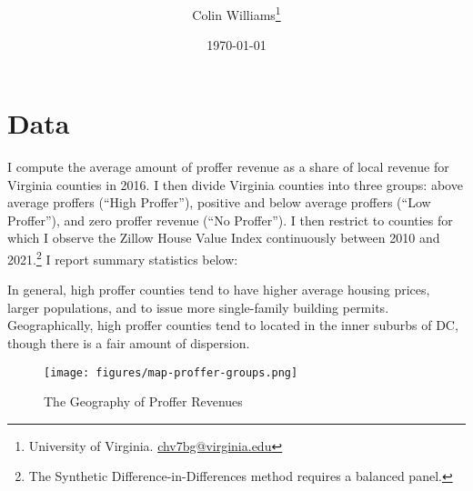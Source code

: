 \documentclass[12pt]{article}
\title{ \vspace*{-2.5cm} \hspace*{-0.5cm} }
\author{Colin Williams\thanks{University of Virginia.
\href{mailto:chv7bg@virginia.edu}{chv7bg@virginia.edu}}}
\date{ \vspace*{0.5cm} \today} %
\begin{document}
\bgroup
\let\footnoterule\relax

\maketitle

\begin{abstract}
\noindent 
\end{abstract}


\noindent 

\section{Data}  \label{sec:data}

I compute the average amount of proffer revenue as a share of local revenue for Virginia counties in 2016. I then divide Virginia counties into three groups: above average proffers (``High Proffer''), positive and below average proffers (``Low Proffer''), and zero proffer revenue (``No Proffer''). I then restrict to counties for which I observe the Zillow House Value Index continuously between 2010 and 2021.\footnote{The Synthetic Difference-in-Differences method requires a balanced panel.} I report summary statistics below:



In general, high proffer counties tend to have higher average housing prices, larger populations, and to issue more single-family building permits. Geographically, high proffer counties tend to located in the inner suburbs of DC, though there is a fair amount of dispersion.

\begin{figure}
    \centering
    \caption{The Geography of Proffer Revenues}
    \texttt{[image: figures/map-proffer-groups.png]}
\end{figure}

\clearpage
\end{document}
